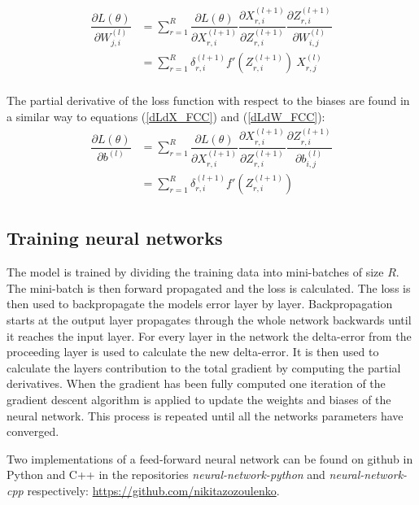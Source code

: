 \documentclass[a4paper, twoside]{article}
\newcommand*{\pd}[2]{\ensuremath{\dfrac{\partial #1}{\partial #2}}}
\begin{document}
\begin{equation}\label{dLdW_FCC}
\begin{split}
\pd{L(\theta)}{W^{(l)}_{j,i}} 
	& = \sum^{R}_{r=1} \pd{L(\theta)}{X^{(l+1)}_{r,i}} \pd{X^{(l+1)}_{r,i}}{Z^{(l+1)}_{r,i}} \pd{Z^{(l+1)}_{r,i}}{W^{(l)}_{i,j}} \\
	& = \sum^{R}_{r=1} \delta^{(l+1)}_{r,i} f'(Z^{(l+1)}_{r,i}) \ X^{(l)}_{r,j}\\
\end{split}
\end{equation}

The partial derivative of the loss function with respect to the biases are found in a similar way to equations (\ref{dLdX_FCC}) and (\ref{dLdW_FCC}): \cite{cs231n} \cite{wikiStanford}
\begin{equation}\label{dLdb_FCC}
\begin{split}
\pd{L(\theta)}{b^{(l)}} 
	& = \sum^{R}_{r=1} \pd{L(\theta)}{X^{(l+1)}_{r,i}} \pd{X^{(l+1)}_{r,i}}{Z^{(l+1)}_{r,i}} \pd{Z^{(l+1)}_{r,i}}{b^{(l)}_{i,j}} \\
	& = \sum^{R}_{r=1} \delta^{(l+1)}_{r,i} f'(Z^{(l+1)}_{r,i}) \\
\end{split}
\end{equation}


\subsection{Training neural networks}
The model is trained by dividing the training data into mini-batches of size $R$. The mini-batch is then forward propagated and the loss is calculated. The loss is then used to backpropagate the models error layer by layer. Backpropagation starts at the output layer propagates through the whole network backwards until it reaches the input layer. For every layer in the network the delta-error from the proceeding layer is used to calculate the new delta-error. It is then used to calculate the layers contribution to the total gradient by computing the partial derivatives. When the gradient has been fully computed one iteration of the gradient descent algorithm is applied to update the weights and biases of the neural network. This process is repeated until all the networks parameters have converged.\cite{cs231n}

Two implementations of a feed-forward neural network can be found on github in Python and C++ in the repositories \textit{neural-network-python} and \textit{neural-network-cpp} respectively: \url{https://github.com/nikitazozoulenko}.
\end{document}

